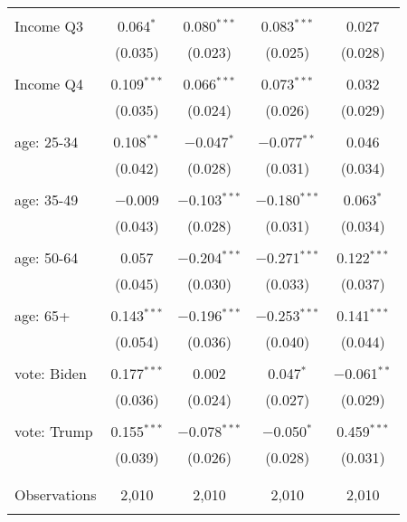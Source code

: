 \begin{tabular}{@{\extracolsep{5pt}}lcccc}
  & & & & \\ 
 Income Q3 & 0.064$^{*}$ & 0.080$^{***}$ & 0.083$^{***}$ & 0.027 \\ 
  & (0.035) & (0.023) & (0.025) & (0.028) \\ 
  & & & & \\ 
 Income Q4 & 0.109$^{***}$ & 0.066$^{***}$ & 0.073$^{***}$ & 0.032 \\ 
  & (0.035) & (0.024) & (0.026) & (0.029) \\ 
  & & & & \\ 
 age: 25-34 & 0.108$^{**}$ & $-$0.047$^{*}$ & $-$0.077$^{**}$ & 0.046 \\ 
  & (0.042) & (0.028) & (0.031) & (0.034) \\ 
  & & & & \\ 
 age: 35-49 & $-$0.009 & $-$0.103$^{***}$ & $-$0.180$^{***}$ & 0.063$^{*}$ \\ 
  & (0.043) & (0.028) & (0.031) & (0.034) \\ 
  & & & & \\ 
 age: 50-64 & 0.057 & $-$0.204$^{***}$ & $-$0.271$^{***}$ & 0.122$^{***}$ \\ 
  & (0.045) & (0.030) & (0.033) & (0.037) \\ 
  & & & & \\ 
 age: 65+ & 0.143$^{***}$ & $-$0.196$^{***}$ & $-$0.253$^{***}$ & 0.141$^{***}$ \\ 
  & (0.054) & (0.036) & (0.040) & (0.044) \\ 
  & & & & \\ 
 vote: Biden & 0.177$^{***}$ & 0.002 & 0.047$^{*}$ & $-$0.061$^{**}$ \\ 
  & (0.036) & (0.024) & (0.027) & (0.029) \\ 
  & & & & \\ 
 vote: Trump & 0.155$^{***}$ & $-$0.078$^{***}$ & $-$0.050$^{*}$ & 0.459$^{***}$ \\ 
  & (0.039) & (0.026) & (0.028) & (0.031) \\ 
  & & & & \\ 
\hline \\[-1.8ex] 

Observations & 2,010 & 2,010 & 2,010 & 2,010 \\ 
\hline 
\hline \\[-1.8ex] 
\end{tabular} 